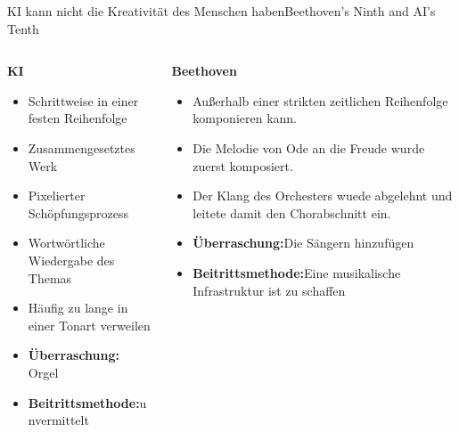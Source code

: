\documentclass[169,9pt]{beamer}
\begin{document}
\begin{frame}{KI kann nicht die Kreativität des Menschen haben}{Beethoven's Ninth
and AI's Tenth}
    \begin{columns}
                \begin{column}{0.45\textwidth}
                    \textbf{KI}
                        \begin{itemize}
                            \item Schrittweise in einer festen Reihenfolge
                            \item Zusammengesetztes Werk
                            \item Pixelierter Schöpfungsprozess
                            \item Wortwörtliche Wiedergabe des Themas
                            \item Häufig zu lange in einer Tonart verweilen
                            \vspace{\baselineskip} 
                            \item \textbf{Überraschung:} Orgel
                            \item \textbf{Beitrittsmethode:}unvermittelt
                        \end{itemize}
                \end{column}
                \begin{column}{0.45\textwidth}
                    \textbf{Beethoven}
                        \begin{itemize}
                            \item Außerhalb einer strikten zeitlichen Reihenfolge komponieren kann.
                            \item Die Melodie von Ode an die Freude wurde zuerst komposiert.
                            \item Der Klang des Orchesters wuede abgelehnt und leitete damit den Chorabschnitt ein.
                            \vspace{\baselineskip}
                            \item \textbf{Überraschung:}Die Sängern hinzufügen
                            \item \textbf{Beitrittsmethode:}Eine musikalische Infrastruktur ist zu schaffen
                        \end{itemize}
                \end{column}
            \end{columns}    
\end{frame}
\end{document}
